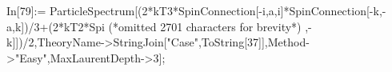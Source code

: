 In[79]:= ParticleSpectrum[(2*kT3*SpinConnection[-i,a,i]*SpinConnection[-k,-a,k])/3+(2*kT2*Spi (*omitted 2701 characters for brevity*) ,-k]])/2,TheoryName->StringJoin["Case",ToString[37]],Method->"Easy",MaxLaurentDepth->3];